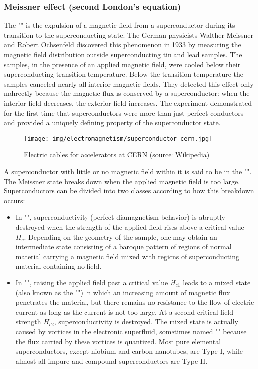 	\subsubsection{Meissner effect (second London's equation)}
	The "" is the expulsion of a magnetic field from a superconductor during its transition to the superconducting state. The German physicists Walther Meissner and Robert Ochsenfeld discovered this phenomenon in 1933 by measuring the magnetic field distribution outside superconducting tin and lead samples. The samples, in the presence of an applied magnetic field, were cooled below their superconducting transition temperature. Below the transition temperature the samples canceled nearly all interior magnetic fields. They detected this effect only indirectly because the magnetic flux is conserved by a superconductor: when the interior field decreases, the exterior field increases. The experiment demonstrated for the first time that superconductors were more than just perfect conductors and provided a uniquely defining property of the superconductor state.
	\begin{figure}[H]
		\centering
		\texttt{[image: img/electromagnetism/superconductor\_cern.jpg]}
		\caption[Electric cables for accelerators at CERN]{Electric cables for accelerators at CERN (source: Wikipedia)}
	\end{figure}
	A superconductor with little or no magnetic field within it is said to be in the "". The Meissner state breaks down when the applied magnetic field is too large. Superconductors can be divided into two classes according to how this breakdown occurs:
	\begin{itemize}
		\item In "", superconductivity (perfect diamagnetism behavior) is abruptly destroyed when the strength of the applied field rises above a critical value $H_c$. Depending on the geometry of the sample, one may obtain an intermediate state consisting of a baroque pattern of regions of normal material carrying a magnetic field mixed with regions of superconducting material containing no field. 
		
		\item In "", raising the applied field past a critical value $H_{c1}$ leads to a mixed state (also known as the "") in which an increasing amount of magnetic flux penetrates the material, but there remains no resistance to the flow of electric current as long as the current is not too large. At a second critical field strength $H_{c2}$, superconductivity is destroyed. The mixed state is actually caused by vortices in the electronic superfluid, sometimes named "" because the flux carried by these vortices is quantized. Most pure elemental superconductors, except niobium and carbon nanotubes, are Type I, while almost all impure and compound superconductors are Type II.
	\end{itemize}
	
